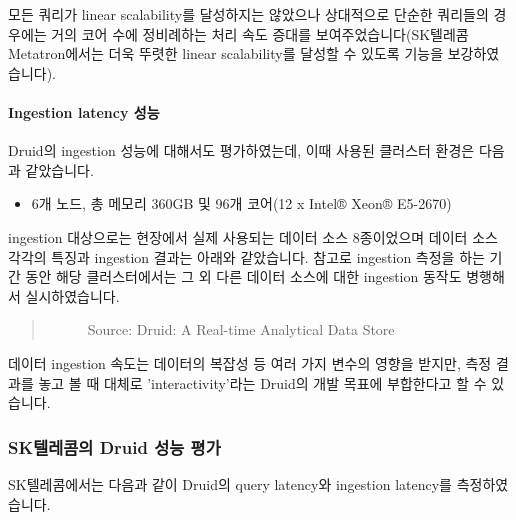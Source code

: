 \documentclass[letterpaper,10pt,english]{sphinxmanual}
\begin{document}
모든 쿼리가 linear scalability를 달성하지는 않았으나 상대적으로 단순한 쿼리들의 경우에는 거의 코어 수에 정비례하는 처리 속도 증대를 보여주었습니다(SK텔레콤 Metatron에서는 더욱 뚜렷한 linear scalability를 달성할 수 있도록 기능을 보강하였습니다).


\paragraph{Ingestion latency 성능}
\label{\detokenize{discovery/part01/druid_tests:ingestion-latency}}
Druid의 ingestion 성능에 대해서도 평가하였는데, 이때 사용된 클러스터 환경은 다음과 같았습니다.
\begin{itemize}
\item {} 
6개 노드, 총 메모리 360GB 및 96개 코어(12 x Intel® Xeon® E5-2670)

\end{itemize}

ingestion 대상으로는 현장에서 실제 사용되는 데이터 소스 8종이었으며 데이터 소스 각각의 특징과 ingestion 결과는 아래와 같았습니다. 참고로 ingestion 측정을 하는 기간 동안 해당 클러스터에서는 그 외 다른 데이터 소스에 대한 ingestion 동작도 병행해서 실시하였습니다.
\begin{quote}

\begin{figure}[H]
\centering
\capstart

\noindent{}
\caption{Source: Druid: A Real-time Analytical Data Store}\label{\detokenize{discovery/part01/druid_tests:id14}}\end{figure}
\end{quote}

데이터 ingestion 속도는 데이터의 복잡성 등 여러 가지 변수의 영향을 받지만, 측정 결과를 놓고 볼 때 대체로 'interactivity'라는 Druid의 개발 목표에 부합한다고 할 수 있습니다.


\subsubsection{SK텔레콤의 Druid 성능 평가}
\label{\detokenize{discovery/part01/druid_tests:sk-druid}}
SK텔레콤에서는 다음과 같이 Druid의 query latency와 ingestion latency를 측정하였습니다.
\end{document}
